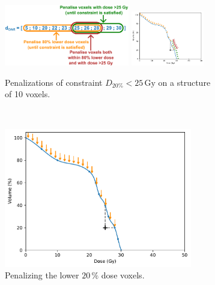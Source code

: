 \begin{figure}
	\centering
	\begin{subfigure}{\textwidth}
		\includegraphics[width=0.6\textwidth]{constraint_penalisation.pdf}
		\hfill
		\includegraphics[width=0.35\textwidth]{constraint_penalisation_plot.pdf}
		\caption{Penalizations of constraint $D_{20\%}< 25\,\text{Gy}$ on a structure of 10 voxels.}
		\label{fig:constraint_penalisation_diagram}
	\end{subfigure}
	\\\vspace{3mm}
	\begin{subfigure}{0.32\textwidth}
		\centering
		\includegraphics[width=0.9\textwidth]{constraint_penalisation_plot_1.pdf}
		\caption{Penalizing the lower $20\,\%$ dose voxels.}
		\label{fig:constraint_penalisation_plot_1}
	\end{subfigure}
	\begin{subfigure}{0.32\textwidth}

\end{subfigure}
\end{figure}
